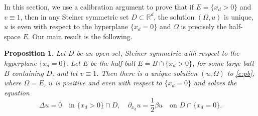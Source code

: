 \documentclass[JEP,XML,SOM,Unicode]{cedram}
\theoremstyle{plain}
\newtheorem{prop}[teo]{Proposition}
\theoremstyle{definition}
\def\R{\mathbb{R}}
\begin{document}
In this section, we use a calibration argument to prove that if $E=\{x_d>0\}$ and $v\equiv 1$, then in any Steiner symmetric set $D\subset\R^d$, the solution $(\Omega,u)$ is unique, $u$ is even with respect to the hyperplane $\{x_d=0\}$ and $\Omega$ is precisely the half-space $E$. Our main result is the following.
\begin{prop}
Let $D$ be an open set, Steiner symmetric with respect to the hyperplane $\{x_d=0\}$. Let $E$ be the half-ball $E=B\cap\{x_d>0\}$, for some large ball $B$ containing $D$, and let $v\equiv 1$. Then there is a unique solution $(u,\Omega)$ to \eqref{e:pb}, where $\Omega=E$, $u$ is positive and even with respect to $\{x_d=0\}$ and solves the equation
\begin{equation}\label{e:esempio}
\Delta u=0\quad\text{in } \{x_d>0\}\cap D,\quad \partial_{x_d} u=\frac{1}2\beta u\quad\text{on } D\cap\{x_d=0\}.
\end{equation}
\end{prop}
\end{document}

